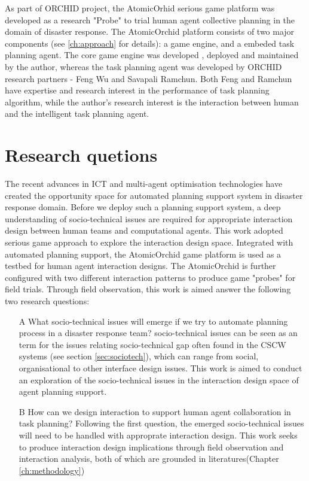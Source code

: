 As part of ORCHID project, the AtomicOrhid serious game platform was developed as a research "Probe" to trial human agent collective planning in the domain of disaster response. The AtomicOrchid platform consists of two major components (see \ref{ch:approach} for details): a game engine, and a embeded task planning agent. The core game engine was developed , deployed and maintained by the author, whereas the task planning agent was developed by ORCHID research partners - Feng Wu and Savapali Ramchun. Both Feng and Ramchun have expertise and research interest in the performance of task planning algorithm, while the author's research interest is the interaction between human and the intelligent task planning agent. \\

\section{Research quetions}
The recent advances in ICT and multi-agent optimisation technologies have created the opportunity space for automated planning support system in disaster response domain. Before we deploy such a planning support system, a deep understanding of socio-technical issues are required for appropriate interaction design between human teams and computational agents. This work adopted serious game approach to explore the interaction design space. Integrated with automated planning support, the AtomicOrchid game platform is used as a testbed for human agent interaction designs.  The AtomicOrchid is further configured with two different interaction patterns to produce game "probes" for field trials. Through field observation, this work is aimed answer the following two research questions:

\begin{enumerate}
\item[A] What socio-technical issues will emerge if we try to automate planning process in a disaster response team? socio-technical issues can be seen as an term for the issues relating socio-technical gap often found in the CSCW systems (see section \ref{sec:sociotech}), which can range from social, organisational to other interface design issues. This work is aimed to conduct an exploration of the socio-technical issues in the interaction design space of agent planning support.

\item[B] How can we design interaction to support human agent collaboration in task planning?
Following the first question, the emerged socio-technical issues will need to be handled with approprate interaction design. This work seeks to produce interaction design implications through field observation and interaction analysis, both of which are grounded in literatures(Chapter \ref{ch:methodology})
\end{enumerate}

